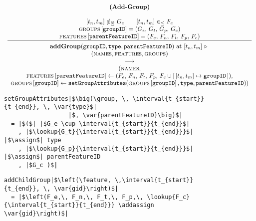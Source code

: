 \begin{figure}
    \renewcommand{\arraystretch}{1.1}
    \sossize$$\begin{array}{c}
      \ntyperule{Add-Group}
      {\\
        \interval{t_n}{t_m} \notinnr G_e \qquad \interval{t_n}{t_m} \inn F_e \\
        \lookup{\groups{}}{\var{groupID}} = \group \\
        \lookup{\features{}}{\var{parentFeatureID}} = \feature 
      }
      {
        \textbf{addGroup}( \var{groupID}, \var{type}, \var{parentFeatureID} ) \text{ at } \interval{t_n}{t_m} \shove \\
        ( \names{}, \features{}, \groups{} ) \\
        \transition \\
        (\names{}, \\
        \lookup{\features{}}{\var{parentFeatureID}} \assign (F_e,\, F_n,\, F_t,\, F_p ,\, F_c \cup \intervalmapping{t_n}{t_m}{\var{groupID}} ), \\ 
      {\lookup{\groups{}}{\var{groupID}}} \assign 
             \var{setGroupAttributes}( \lookup{\groups{}}{\var{groupID}}, \var{type}, \var{parentFeatureID} )  )
      }
    \end{array}$$
  \caption{\label{rule:add-group}}
\end{figure}

\begin{figure}
  \begin{verbatim}
setGroupAttributes|$\big(\group, \, \interval{t_{start}}{t_{end}}, \, \var{type}$|
                  |$, \var{parentFeatureID}\big)$|
  = |$($| |$G_e \cup \interval{t_{start}}{t_{end}}$|
    , |$\lookup{G_t}{\interval{t_{start}}{t_{end}}}$| |$\assign$| type
    , |$\lookup{G_p}{\interval{t_{start}}{t_{end}}}$| |$\assign$| parentFeatureID
    , |$G_c )$|
     \end{verbatim}
  \caption{\label{fun:set-group-attributes}}
\end{figure}

\begin{figure}
  \begin{verbatim}
addChildGroup|$\left(\feature, \,\interval{t_{start}}{t_{end}}, \, \var{gid}\right)$|
  = |$\left(F_e,\, F_n,\, F_t,\, F_p,\, \lookup{F_c}{\interval{t_{start}}{t_{end}}} \addassign \var{gid}\right)$|
  \end{verbatim}
  \caption{\label{fun:add-child-group}}
\end{figure}

